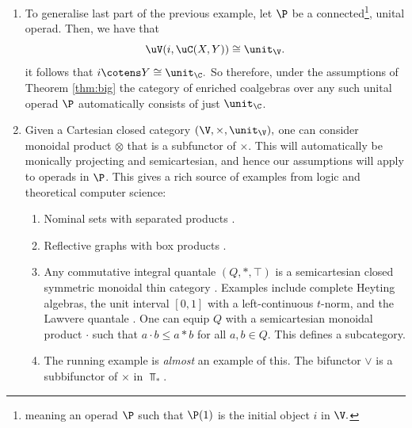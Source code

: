 \documentclass{tac}
\def\bTop{{\Top_\ast}}
\begin{document}
\begin{enumerate}
    The map $\C(c, X\otimes Y) \to \C(c, X) \times \C(c, Y)$ may fail to be an isomorphism in an arbitrary monically projecting semicartesian category. For example, we may consider $(\bTop, \vee)$.  In this case, the comonad will be a subcomonad of the identity comonad.  This implies that every object in the category has either one or zero cocommutative counital coalgebra structures on it. In the case of $(\bTop, \vee)$, the only cocommutative coalgebra is $\ast.$ Another example: Lawvere metric spaces with addition \cite{Lawvere73}. This is not Cartesian, but it can be easily verified to be semicartesian and monically projecting over $\Set$.
    \item 
    To generalise last part of the previous example, let $\P$ be a connected\footnote{meaning an operad $\P$ such that $\P(1)$ is the initial object $i$ in $\V.$}, unital operad. Then, we have that 
    $$
    \uV(i, \uC(X, Y)) \cong  \unit_{\V}.
    $$
    it follows that $i \cotens Y \cong \unit_{\C}.$ So therefore, under the assumptions of Theorem \ref{thm:big} the category of enriched coalgebras over any such  unital operad $\P$ automatically consists of just $\unit_\C$.
    \item 
    Given a Cartesian closed category $(\V, \times, \unit_{\V}),$ one can consider monoidal product $\otimes $ that is a subfunctor of $\times.$ This will automatically be monically projecting and semicartesian, and hence our assumptions will apply to operads in $\P$. This gives a rich source of examples from logic and theoretical computer science:
    \begin{enumerate}
        \item 
        Nominal sets with separated products \cite[Section 3.4]{pitts13}. 
        \item 
        Reflective graphs with box products \cite{Kapulkin24}.
        \item 
        Any commutative integral quantale $(Q, \ast, \top)$ is a semicartesian closed symmetric monoidal thin category \cite{flagg97}. Examples include complete Heyting algebras, the unit interval $[0,1]$ with a left-continuous $t$-norm, and the Lawvere quantale \cite{Lawvere73}. One can equip $Q$ with a semicartesian monoidal product $\cdot $ such that $a \cdot b  \le a \ast b$ for all $a,b \in Q$. This defines a subcategory.
        \item 
        The running example is \emph{almost} an example of this. The bifunctor $\vee$ is a subbifunctor of $\times$ in $\bTop.$
    \end{enumerate}

\end{enumerate}
\end{document}
